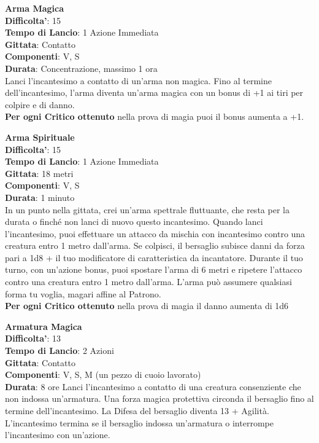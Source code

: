 \begin{multicols}{2}
\medskip\textbf{Arma Magica}\\
\textbf{Difficolta'}: 15\\
\textbf{Tempo di Lancio}: 1 Azione Immediata\\
\textbf{Gittata}: Contatto\\
\textbf{Componenti}: V, S\\
\textbf{Durata}: Concentrazione, massimo 1 ora\\
Lanci l’incantesimo a contatto di un’arma non magica. Fino al termine dell’incantesimo, l’arma diventa un’arma magica con un bonus di +1 ai tiri per colpire e di danno.\\
\textbf{Per ogni Critico ottenuto} nella prova di magia puoi il bonus aumenta a +1.

\medskip\textbf{Arma Spirituale}\\
\textbf{Difficolta'}: 15\\
\textbf{Tempo di Lancio}: 1 Azione Immediata\\
\textbf{Gittata}: 18 metri\\
\textbf{Componenti}: V, S\\
\textbf{Durata}: 1 minuto\\
In un punto nella gittata, crei un’arma spettrale fluttuante, che resta per la durata o finché non lanci di nuovo questo incantesimo. Quando lanci l’incantesimo, puoi effettuare un attacco da mischia con incantesimo contro una creatura entro 1 metro dall’arma. Se colpisci, il bersaglio subisce danni da forza pari a 1d8 + il tuo modificatore di caratteristica da incantatore. Durante il tuo turno, con un’azione bonus, puoi spostare l’arma di 6 metri e ripetere l’attacco contro una creatura entro 1 metro dall’arma. L’arma può assumere qualsiasi forma tu voglia, magari affine al Patrono.\\
\textbf{Per ogni Critico ottenuto} nella prova di magia il danno aumenta di 1d6

\medskip\textbf{Armatura Magica}\\
\textbf{Difficolta'}: 13\\
\textbf{Tempo di Lancio}: 2 Azioni\\
\textbf{Gittata}: Contatto\\
\textbf{Componenti}: V, S, M (un pezzo di cuoio lavorato)\\
\textbf{Durata}: 8 ore
Lanci l’incantesimo a contatto di una creatura consenziente che non indossa un’armatura. Una forza magica protettiva circonda il bersaglio fino al termine dell’incantesimo. La Difesa del bersaglio diventa 13 + Agilità. L’incantesimo termina se il bersaglio indossa un’armatura o interrompe l’incantesimo con un’azione.



\end{multicols}
